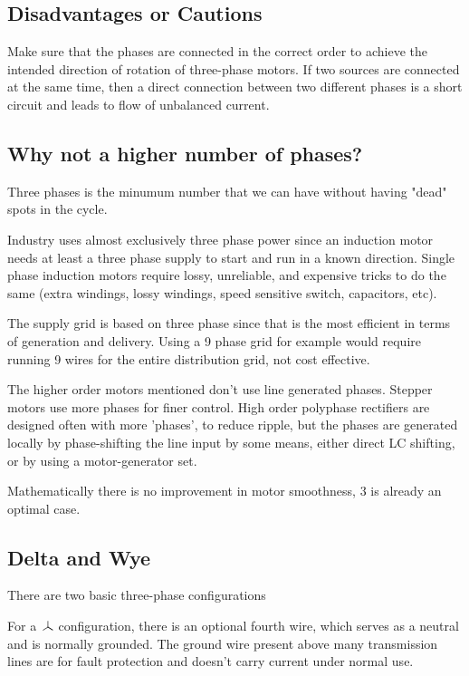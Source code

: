 \subsection{Disadvantages or Cautions}
Make sure that the phases are connected in the correct order to achieve the intended direction of rotation of three-phase motors. If two sources are connected at the same time, then a direct connection between two different phases is a short circuit and leads to flow of unbalanced current.

\subsection{Why not a higher number of phases?}
Three phases is the minumum number that we can have without having "dead" spots in the cycle.

Industry uses almost exclusively three phase power since an induction motor needs at least a three phase supply to start and run in a known direction. Single phase induction motors require lossy, unreliable, and expensive tricks to do the same (extra windings, lossy windings, speed sensitive switch, capacitors, etc).

The supply grid is based on three phase since that is the most efficient in terms of generation and delivery. Using a 9 phase grid for example would require running 9 wires for the entire distribution grid, not cost effective.

The higher order motors mentioned don't use line generated phases. Stepper motors use more phases for finer control. High order polyphase rectifiers are designed often with more 'phases', to reduce ripple, but the phases are generated locally by phase-shifting the line input by some means, either direct LC shifting, or by using a motor-generator set.

Mathematically there is no improvement in motor smoothness, 3 is already an optimal case.

\subsection{Delta and Wye}
There are two basic three-phase configurations


For a $\wye$ configuration, there is an optional fourth wire, which serves as a neutral and is normally grounded. The ground wire present above many transmission lines are for fault protection and doesn't carry current under normal use.

